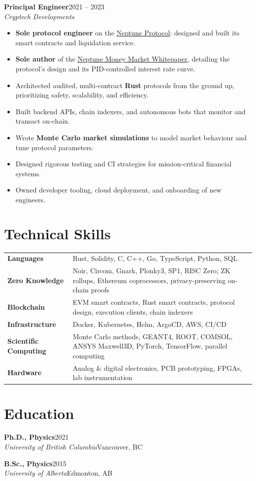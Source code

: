 \documentclass[11pt,letterpaper]{article}
\newcommand{\entry}[4]{%
  \textbf{#1}\hfill{\color{muted}#2}\\
  {\color{muted}\itshape #3}\hfill{\color{muted}\small #4}\par\vspace{1pt}}
\newcommand{\link}[2]{\href{#1}{\color{accent}#2}}
\newcommand{\skill}[2]{\textbf{#1} & #2 \\[2pt]}
\begin{document}
\vspace{6pt}
\entry{Principal Engineer}{2021 -- 2023}{Cryptech Developments}{}
\begin{itemize}
  \item \textbf{Sole protocol engineer} on the \link{https://app.nept.finance}{Neptune Protocol}: designed and built its smart
        contracts and liquidation service.
  \item \textbf{Sole author} of the \link{https://blog.woolsey.dev/neptune-whitepaper.pdf}{Neptune Money Market Whitepaper},
        detailing the protocol's design and its PID-controlled interest rate curve.
  \item Architected audited, multi-contract \textbf{Rust} protocols from the ground up, prioritizing safety,
        scalability, and efficiency.
  \item Built backend APIs, chain indexers, and autonomous bots that monitor and transact on-chain.
  \item Wrote \textbf{Monte Carlo market simulations} to model market behaviour and tune protocol parameters.
  \item Designed rigorous testing and CI strategies for mission-critical financial systems.
  \item Owned developer tooling, cloud deployment, and onboarding of new engineers.
\end{itemize}

\section{Technical Skills}
\begin{tabularx}{\linewidth}{@{}>{\raggedright\arraybackslash}p{3.9cm}>{\raggedright\arraybackslash}X@{}}
  \skill{Languages}{Rust, Solidity, C, C++, Go, TypeScript, Python, SQL}
  \skill{Zero Knowledge}{Noir, Circom, Gnark, Plonky3, SP1, RISC Zero; ZK rollups, Ethereum coprocessors,
    privacy-preserving on-chain proofs}
  \skill{Blockchain}{EVM smart contracts, Rust smart contracts, protocol design, execution clients, chain indexers}
  \skill{Infrastructure}{Docker, Kubernetes, Helm, ArgoCD, AWS, CI/CD}
  \skill{Scientific Computing}{Monte Carlo methods, GEANT4, ROOT, COMSOL, ANSYS Maxwell3D, PyTorch, TensorFlow,
    parallel computing}
  \skill{Hardware}{Analog \& digital electronics, PCB prototyping, FPGAs, lab instrumentation}
\end{tabularx}

\section{Education}
\entry{Ph.D., Physics}{2021}{University of British Columbia}{Vancouver, BC}
\vspace{3pt}
\entry{B.Sc., Physics}{2015}{University of Alberta}{Edmonton, AB}
\end{document}
